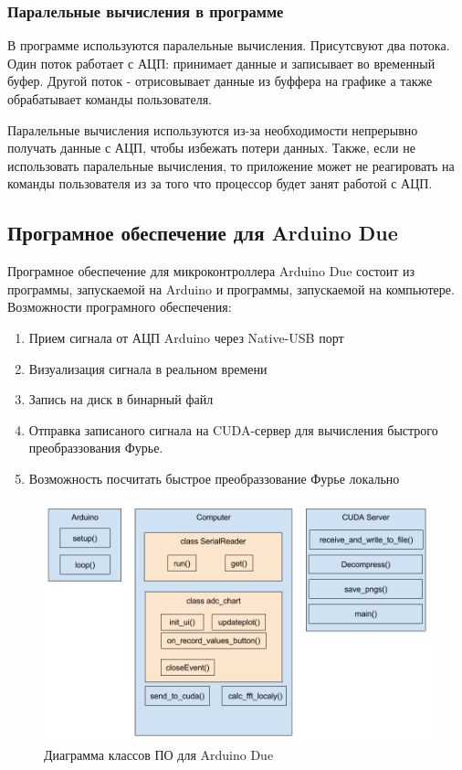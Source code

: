 \documentclass[../paper.tex]{subfiles}
\begin{document}
\subsubsection{Паралельные вычисления в программе}
В программе используются паралельные вычисления. Присутсвуют два потока. Один поток работает с АЦП: принимает данные и записывает во временный буфер. Другой поток - отрисовывает данные из буффера на графике а также обрабатывает команды пользователя. 

Паралельные вычисления используются из-за необходимости непрерывно получать данные с АЦП, чтобы избежать потери данных. Также, если не использовать паралельные вычисления, то приложение может не реагировать на команды пользователя из за того что процессор будет занят работой с АЦП.

\subsection{Програмное обеспечение для Arduino Due}
Програмное обеспечение для микроконтроллера Arduino Due состоит из программы, запускаемой на Arduino и программы, запускаемой на компьютере. 
Возможности програмного обеспечения:
\begin{enumerate}
  \item Прием сигнала от АЦП Arduino через Native-USB порт
  \item Визуализация сигнала в реальном времени
  \item Запись на диск в бинарный файл
  \item Отправка записаного сигнала на CUDA-сервер для вычисления быстрого преобраззования Фурье.
  \item Возможность посчитать быстрое преобраззование Фурье локально
\end{enumerate}

\begin{figure}[H]
\centering
\includegraphics[width=\textwidth]{images/soft-blueprint.png}
\caption{Диаграмма классов ПО для Arduino Due}
\end{figure}
\end{document}
